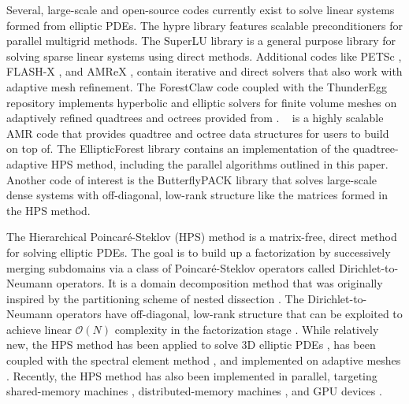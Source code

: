 Several, large-scale and open-source codes currently exist to solve linear systems formed from elliptic PDEs. The hypre library \citep{falgout2002hypre} features scalable preconditioners for parallel multigrid methods. The SuperLU library \citep{li2005superlu} is a general purpose library for solving sparse linear systems using direct methods. Additional codes like PETSc \citep{anl2023petsc}, FLASH-X \citep{dubey2022flash}, and AMReX \citep{zhang2019amrex}, contain iterative and direct solvers that also work with adaptive mesh refinement. The ForestClaw code \citep{calhoun2017forestclaw} coupled with the ThunderEgg repository \citep{aiton2022thunderegg} implements hyperbolic and elliptic solvers for finite volume meshes on adaptively refined quadtrees and octrees provided from \pforest. \pforest\ \citep{burstedde2011p4est,burstedde2020parallel} is a highly scalable AMR code that provides quadtree and octree data structures for users to build on top of. The EllipticForest library \citep{chipman2024ellipticforest} contains an implementation of the quadtree-adaptive HPS method, including the parallel algorithms outlined in this paper. Another code of interest is the ButterflyPACK library \citep{liu2018butterflypack} that solves large-scale dense systems with off-diagonal, low-rank structure like the matrices formed in the HPS method.

The Hierarchical Poincaré-Steklov (HPS) method \citep{martinsson2015hierarchical, gillman2014direct} is a matrix-free, direct method for solving elliptic PDEs. The goal is to build up a factorization by successively merging subdomains via a class of Poincar\'e-Steklov operators \citep{quarteroni1991theory} called Dirichlet-to-Neumann operators. It is a domain decomposition method that was originally inspired by the partitioning scheme of nested dissection \citep{george1973nested,lipton1979generalized}. The Dirichlet-to-Neumann operators have off-diagonal, low-rank structure that can be exploited to achieve linear $\mathcal{O}(N)$ complexity in the factorization stage \citep{gillman2014direct}. While relatively new, the HPS method has been applied to solve 3D elliptic PDEs \citep{hao2016direct}, has been coupled with the spectral element method \citep{fortunato2020ultraspherical}, and implemented on adaptive meshes \citep{babb2018accelerated, geldermans2019adaptive,chipman2024fast}. Recently, the HPS method has also been implemented in parallel, targeting shared-memory machines \citep{beams2020parallel}, distributed-memory machines \citep{yesypenko2022parallel}, and GPU devices \citep{yesypenko2022gpu}.

